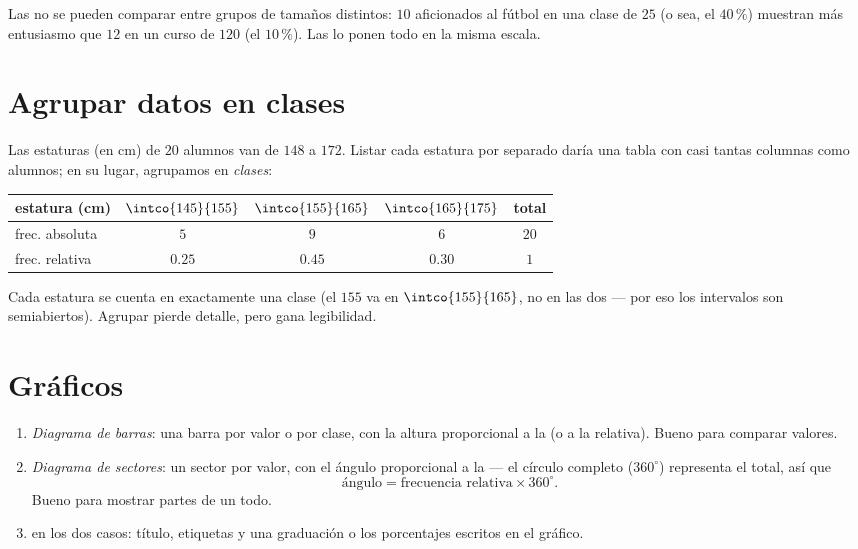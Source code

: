 \begin{remark}
Las  no se pueden comparar entre grupos de tamaños distintos: $10$
aficionados al fútbol en una clase de $25$ (o sea, el $40\,\%$) muestran más
entusiasmo que $12$ en un curso de $120$ (el $10\,\%$).
Las  lo ponen todo en la misma escala.
\end{remark}

\section{Agrupar datos en clases}

\begin{example}[Clases]\label{ex:g7:stats:classes}
Las estaturas (en cm) de $20$ alumnos van de $148$ a $172$.
Listar cada estatura por separado daría una tabla con casi tantas
columnas como alumnos; en su lugar, agrupamos en \emph{clases}:
\begin{center}
\renewcommand{\arraystretch}{1.3}
\begin{tabular}{l|ccc|c}
estatura (cm) & $\intco{145}{155}$ & $\intco{155}{165}$ &
$\intco{165}{175}$ & total \\
\hline
frec. absoluta & $5$ & $9$ & $6$ & $20$ \\
frec. relativa & $0.25$ & $0.45$ & $0.30$ & $1$ \\
\end{tabular}
\end{center}
Cada estatura se cuenta en exactamente una clase (el $155$ va en
$\intco{155}{165}$, no en las dos --- por eso los intervalos son
semiabiertos). Agrupar pierde detalle, pero gana legibilidad.
\end{example}

\section{Gráficos}

\begin{method}\label{met:g7:stats:charts}
\begin{enumerate}
  \item \emph{Diagrama de barras}: una barra por valor o por clase, con la altura
        proporcional a la  (o a la relativa). Bueno para
        comparar valores.
  \item \emph{Diagrama de sectores}: un sector por valor, con el ángulo proporcional a
        la  --- el círculo completo ($360^\circ$) representa el
        total, así que
        \[
        \text{ángulo} = \text{frecuencia relativa} \times 360^\circ .
        \]
        Bueno para mostrar partes de un todo.
  \item en los dos casos: título, etiquetas y una graduación o los
        porcentajes escritos en el gráfico.
\end{enumerate}
\end{method}

